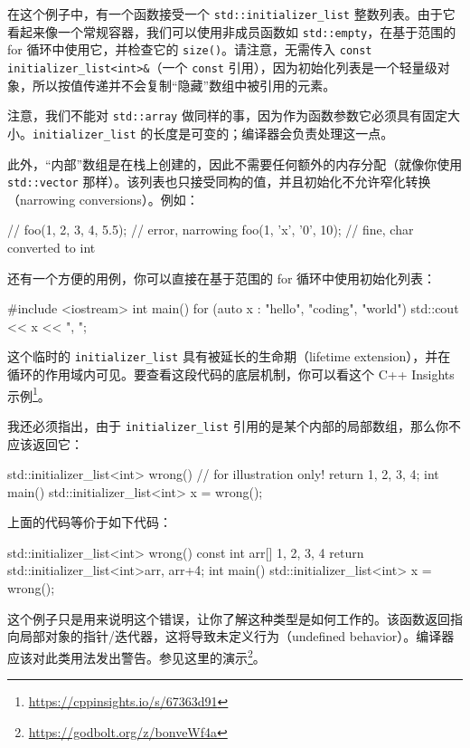 在这个例子中，有一个函数接受一个 \texttt{std::initializer\_list} 整数列表。由于它看起来像一个常规容器，我们可以使用非成员函数如 \texttt{std::empty}，在基于范围的 for 循环中使用它，并检查它的 \texttt{size()}。请注意，无需传入 \texttt{const initializer\_list<int>\&}（一个 \texttt{const} 引用），因为初始化列表是一个轻量级对象，所以按值传递并不会复制“隐藏”数组中被引用的元素。

注意，我们不能对 \texttt{std::array} 做同样的事，因为作为函数参数它必须具有固定大小。\texttt{initializer\_list} 的长度是可变的；编译器会负责处理这一点。

此外，“内部”数组是在栈上创建的，因此不需要任何额外的内存分配（就像你使用 \texttt{std::vector} 那样）。该列表也只接受同构的值，并且初始化不允许窄化转换（narrowing conversions）。例如：

\begin{codebox}[cpp]
// foo({1, 2, 3, 4, 5.5}); // error, narrowing
foo({1, 'x', '0', 10}); // fine, char converted to int
\end{codebox}

还有一个方便的用例，你可以直接在基于范围的 for 循环中使用初始化列表：

\begin{codebox}[cpp]
#include <iostream>
int main() {
    for (auto x : {"hello", "coding", "world"})
        std::cout << x << ", ";
}
\end{codebox}

这个临时的 \texttt{initializer\_list} 具有被延长的生命期（lifetime extension），并在循环的作用域内可见。要查看这段代码的底层机制，你可以看这个 C++ Insights 示例\footnote{\url{https://cppinsights.io/s/67363d91}}。

我还必须指出，由于 \texttt{initializer\_list} 引用的是某个内部的局部数组，那么你不应该返回它：

\begin{codebox}[cpp]
std::initializer_list<int> wrong() { // for illustration only!
    return { 1, 2, 3, 4};
}
int main() {
    std::initializer_list<int> x = wrong();
}
\end{codebox}

上面的代码等价于如下代码：

\begin{codebox}[cpp]
std::initializer_list<int> wrong() {
    const int arr[] { 1, 2, 3, 4}
    return std::initializer_list<int>{arr, arr+4};
}
int main() {
    std::initializer_list<int> x = wrong();
}
\end{codebox}

这个例子只是用来说明这个错误，让你了解这种类型是如何工作的。该函数返回指向局部对象的指针/迭代器，这将导致未定义行为（undefined behavior）。编译器应该对此类用法发出警告。参见这里的演示\footnote{\url{https://godbolt.org/z/bonveWf4a}}。


